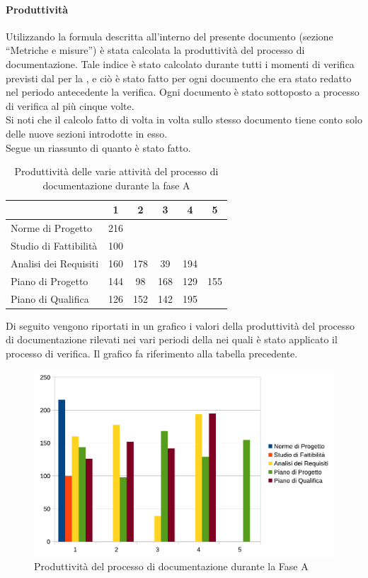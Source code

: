 			\paragraph{Produttività}
				Utilizzando la formula descritta all'interno del presente documento (sezione “Metriche e misure”) è stata calcolata la produttività del 
				processo di documentazione. Tale indice è stato calcolato durante tutti i momenti di verifica previsti dal  per 
				la , e ciò è stato fatto per ogni documento che era stato redatto nel periodo antecedente la verifica. Ogni documento è stato 
				sottoposto a processo di verifica al più cinque volte.\\
				Si noti che il calcolo fatto di volta in volta sullo stesso documento tiene conto solo delle nuove sezioni introdotte in esso.\\
				Segue un riassunto di quanto è stato fatto.
				\begin{table}[H]
					\centering
					\begin{tabu}{| l | c | c | c | c | c |}
						\hline
							&1	&2	&3	&4	&5	\\ \hline
						Norme di Progetto	&216 &	&	&	& \\ \hline
						Studio di Fattibilità	&100	&	&	&	& \\ \hline
						Analisi dei Requisiti	&160	&178	&39	&194	& \\ \hline
						Piano di Progetto	&144	&98	&168	&129	&155 \\ \hline
						Piano di Qualifica	&126	&152	&142	&195	&\\ \hline
					\end{tabu}
					\caption{Produttività delle varie attività del processo di documentazione durante la fase A}
				\end{table}
				Di seguito vengono riportati in un grafico i valori della produttività del processo di documentazione rilevati nei vari periodi della 
				 nei quali è stato applicato il processo di verifica. Il grafico fa riferimento alla tabella precedente.
				\begin{figure}[H]
					\centering
					\includegraphics[width=12cm]{PianoDiQualifica/Pics/ProduttivitaDocumentazioneFaseA.pdf}
					\caption{Produttività del processo di documentazione durante la Fase A}
				\end{figure}

